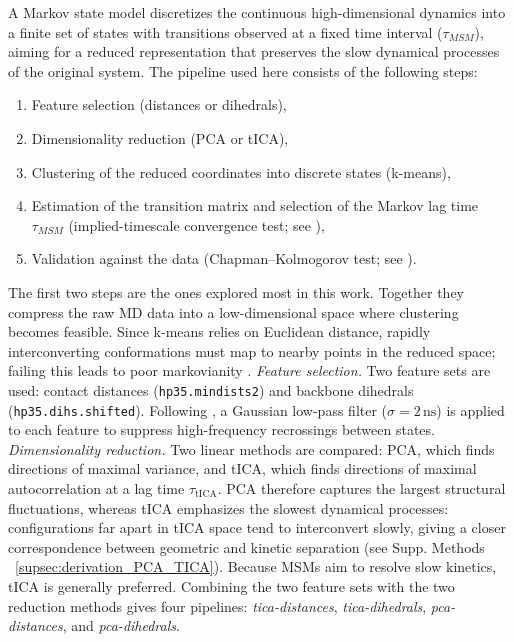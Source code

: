 \documentclass[prl,twocolumn]{revtex4-1}
\begin{document}
A Markov state model discretizes the continuous high-dimensional dynamics into a finite set of states with transitions observed at a fixed time interval ($\tau_{MSM}$), aiming for a reduced representation that preserves the slow dynamical processes of the original system. The pipeline used here consists of the following steps:
\begin{enumerate}
    \setlength{\itemsep}{0.01em}
\item Feature selection (distances or dihedrals),
\item Dimensionality reduction (PCA or tICA),
\item Clustering of the reduced coordinates into discrete states (k-means),
\item Estimation of the transition matrix and selection of the Markov lag time $\tau_{MSM}$ (implied-timescale convergence test; see \cite[Ch. 2.4.1]{thebible}),
\item Validation against the data (Chapman--Kolmogorov test; see \cite[Ch. 4.8]{thebible}).
\end{enumerate}
The first two steps are the ones explored most in this work. Together they compress the raw MD data into a low-dimensional space where clustering becomes feasible. Since k-means relies on Euclidean distance, rapidly interconverting conformations must map to nearby points in the reduced space; failing this leads to poor markovianity \cite{pyemma_tutorial}.
\smallskip \newline \textit{Feature selection.}
Two feature sets are used: contact distances (\texttt{hp35.mindists2}) and backbone dihedrals (\texttt{hp35.dihs.shifted}). Following \cite{selecting_features}, a Gaussian low-pass filter ($\sigma = 2\,\mathrm{ns}$) is applied to each feature to suppress high-frequency recrossings between states.
\smallskip \newline \textit{Dimensionality reduction.}
Two linear methods are compared: PCA, which finds directions of maximal variance, and tICA, which finds directions of maximal autocorrelation at a lag time $\tau_{\mathrm{tICA}}$. PCA therefore captures the largest structural fluctuations, whereas tICA emphasizes the slowest dynamical processes: configurations far apart in tICA space tend to interconvert slowly, giving a closer correspondence between geometric and kinetic separation (see Supp. Methods ~\ref{supsec:derivation_PCA_TICA}). Because MSMs aim to resolve slow kinetics, tICA is generally preferred. Combining the two feature sets with the two reduction methods gives four pipelines: \textit{tica-distances}, \textit{tica-dihedrals}, \textit{pca-distances}, and \textit{pca-dihedrals}.
\end{document}
